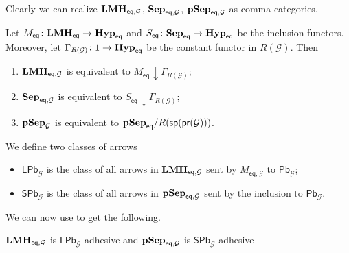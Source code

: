 \documentclass[3p]{elsarticle}
\newcommand{\pbc}{\mathsf{Pb}}
\newcommand{\pbl}{\mathsf{LPb}}
\newcommand{\pbs}{\mathsf{SPb}}
\newcommand{\eq}{\mathsf{eq}}
\newcommand{\catname}[1]{\textbf{\textup{#1}}}
\newcommand{\lmo}{\catname{LMH}}
\newcommand{\pshyp}{\catname{pSep}}
\newcommand{\shyp}{\catname{Sep}}
\newcommand{\EqHyp}{\catname{Hyp}_{\mathsf{eq}}} %
\newcommand{\EqsHyp}{\catname{Sep}_{\mathsf{eq}}}
\newcommand{\Eqlmo}{\catname{LMH}_{\mathsf{eq}}}
\renewcommand{\sp}{\mathsf{sp}}
\newcommand{\pr}{\mathsf{pr}}
\renewcommand{\comma}[2]{#1\hspace{1pt} {\downarrow}#2}
\theoremstyle{remark}
\theoremstyle{definition}
\begin{document}
 Clearly we can realize $\lmo_{\eq, \mathcal{G}}$, $\shyp_{\eq, \mathcal{G}}$, $\pshyp_{\eq, \mathcal{G}}$ as comma categories.
 
 \begin{prop}
 	Let $M_{\eq}\colon \Eqlmo\to \EqHyp$ and $S_{\eq}\colon \EqsHyp \to \EqHyp$ be the inclusion functors. Moreover, let $\Gamma_{R(\mathcal{G})}\colon 1\to \EqHyp$ be the constant functor in $R(\mathcal{G})$. Then
 	\begin{enumerate}
 		\item $\lmo_{\eq, \mathcal{G}}$ is equivalent to $\comma{M_\eq}{\Gamma_{R(\mathcal{G})}}$;
 		\item $\shyp_{\eq, \mathcal{G}}$ is equivalent to $\comma{S_\eq}{\Gamma_{R(\mathcal{G})}}$; 
 		\item $\pshyp_{\mathcal{G}}$ is equivalent to $\pshyp_{\eq}/R(\sp(\pr(\mathcal{G})))$. 
 	\end{enumerate}
 \end{prop}

\begin{defi}We define two classes of arrows
	\begin{itemize}
		\item $\pbl_{\mathcal{G}}$ is the class of all arrows in $\lmo_{\eq, \mathcal{G}}$ sent by $M_{\eq, \mathcal{G}}$ to $\pbc_{\mathcal{G}}$;
		\item $\pbs_{\mathcal{G}}$ is the class of all arrows in $\pshyp_{\eq, \mathcal{G}}$ sent by the inclusion  to $\pbc_{\mathcal{G}}$.
	\end{itemize}
\end{defi}

We can  now use  to get the following.

\begin{cor}$\lmo_{\eq, \mathcal{G}}$ is $\pbl_{\mathcal{G}}$-adhesive and $\pshyp_{\eq, \mathcal{G}}$ is $\pbs_{\mathcal{G}}$-adhesive
\end{cor}
\end{document}

